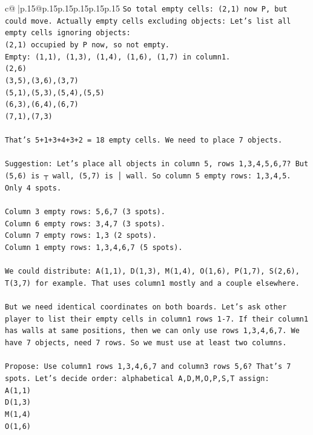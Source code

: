 \documentclass{article}
\begin{document}
{\begin{supertabular}{c@{$\;$}|p{.15\linewidth}@{}p{.15\linewidth}p{.15\linewidth}p{.15\linewidth}p{.15\linewidth}p{.15\linewidth}}
{{{\texttt{So total empty cells: (2,1) now P, but could move. Actually empty cells excluding objects: Let's list all empty cells ignoring objects:  } \\
\texttt{(2,1) occupied by P now, so not empty.  } \\
\texttt{Empty: (1,1), (1,3), (1,4), (1,6), (1,7) in column1.  } \\
\texttt{(2,6)  } \\
\texttt{(3,5),(3,6),(3,7)  } \\
\texttt{(5,1),(5,3),(5,4),(5,5)  } \\
\texttt{(6,3),(6,4),(6,7)  } \\
\texttt{(7,1),(7,3)} \\
\\ 
\texttt{That's 5+1+3+4+3+2 = 18 empty cells. We need to place 7 objects.} \\
\\ 
\texttt{Suggestion: Let's place all objects in column 5, rows 1,3,4,5,6,7? But (5,6) is ┬ wall, (5,7) is │ wall. So column 5 empty rows: 1,3,4,5. Only 4 spots.} \\
\\ 
\texttt{Column 3 empty rows: 5,6,7 (3 spots).  } \\
\texttt{Column 6 empty rows: 3,4,7 (3 spots).  } \\
\texttt{Column 7 empty rows: 1,3 (2 spots).  } \\
\texttt{Column 1 empty rows: 1,3,4,6,7 (5 spots).} \\
\\ 
\texttt{We could distribute: A(1,1), D(1,3), M(1,4), O(1,6), P(1,7), S(2,6), T(3,7) for example. That uses column1 mostly and a couple elsewhere.} \\
\\ 
\texttt{But we need identical coordinates on both boards. Let's ask other player to list their empty cells in column1 rows 1{-}7. If their column1 has walls at same positions, then we can only use rows 1,3,4,6,7. We have 7 objects, need 7 rows. So we must use at least two columns.} \\
\\ 
\texttt{Propose: Use column1 rows 1,3,4,6,7 and column3 rows 5,6? That's 7 spots. Let's decide order: alphabetical A,D,M,O,P,S,T assign:  } \\
\texttt{A(1,1)  } \\
\texttt{D(1,3)  } \\
\texttt{M(1,4)  } \\
\texttt{O(1,6)  } \\
}}}
\end{supertabular}}
\end{document}
